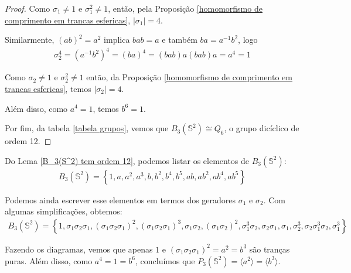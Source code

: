 \begin{proof}
		\par\vspace{0.3cm} Como $\sigma_1\neq 1$ e $\sigma_1^2\neq 1$, então, pela Proposição \eqref{homomorfismo de comprimento em trancas esfericas}, $|\sigma_1| = 4$.
		\par\vspace{0.3cm} Similarmente, $(ab)^2 = a^2$ implica $bab=a$ e também $ba=a^{-1}b^2$, logo
		\begin{align*}
		\sigma_2^4 = (a^{-1}b^2)^4 = (ba)^4 = (bab)a(bab)a = a^4 = 1
		\end{align*}
		\par\vspace{0.3cm} Como $\sigma_2\neq1$ e $\sigma_2^2\neq1$ então, da Proposição \eqref{homomorfismo de comprimento em trancas esfericas}, temos $|\sigma_2|=4$. 
		\par\vspace{0.3cm} Além disso, como $a^4 = 1$, temos $b^6=1$.
		\par\vspace{0.3cm} Por fim, da tabela \eqref{tabela grupos}, vemos que $B_3(\mathbb{S}^2)\cong Q_6$, o grupo dicíclico de ordem 12.
	\end{proof}
	
	\par\vspace{0.3cm} Do Lema \eqref{B_3(S^2) tem ordem 12}, podemos listar os elementos de $B_3(\mathbb{S}^2)$:
	\begin{align*}
	B_3(\mathbb{S}^2) = \left\{ 1, a, a^2, a^3, b, b^2, b^4, b^5, ab, ab^2, ab^4, ab^5 \right\}
	\end{align*}
	\par\vspace{0.3cm} Podemos ainda escrever esse elementos em termos dos geradores $\sigma_1$ e $\sigma_2$. Com algumas simplificações, obtemos:
	\begin{align*}
	B_3(\mathbb{S}^2) = \left\{ 1, \sigma_1\sigma_2\sigma_1, (\sigma_1\sigma_2\sigma_1)^2, (\sigma_1\sigma_2\sigma_1)^3, \sigma_1\sigma_2, (\sigma_1\sigma_2)^2, \sigma_1^3\sigma_2, \sigma_2\sigma_1, \sigma_1, \sigma_2^3, \sigma_2\sigma_1^3\sigma_2, \sigma_1^3 \right\}
	\end{align*}
	\par\vspace{0.3cm} Fazendo os diagramas, vemos que apenas $1$ e $(\sigma_1\sigma_2\sigma_1)^2 = a^2 = b^3$ são tranças puras. Além disso, como $a^4 = 1 = b^6$, concluímos que $P_3(\mathbb{S}^2) = \langle a^2 \rangle = \langle b^3 \rangle$.
	
